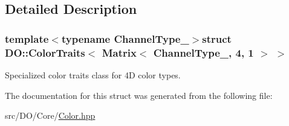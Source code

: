 \subsection{Detailed Description}
\subsubsection*{template$<$typename Channel\-Type\-\_\-$>$struct D\-O\-::\-Color\-Traits$<$ Matrix$<$ Channel\-Type\-\_\-, 4, 1 $>$ $>$}

Specialized color traits class for 4\-D color types. 

The documentation for this struct was generated from the following file\-:\begin{DoxyCompactItemize}
\item 
src/\-D\-O/\-Core/\hyperlink{_color_8hpp}{Color.\-hpp}\end{DoxyCompactItemize}
